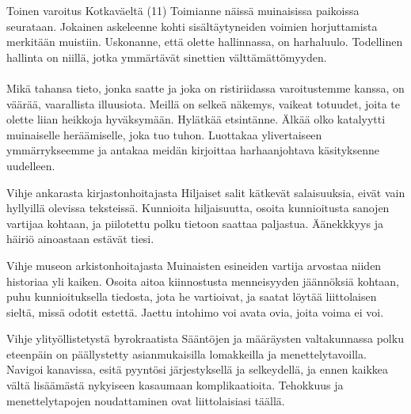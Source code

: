 \documentclass[a4paper,12pt]{article}
\begin{document}
\begin{biginfobox}{Toinen varoitus Kotkaväeltä (11)}
Toimianne näissä muinaisissa paikoissa seurataan. Jokainen askeleenne kohti sisältäytyneiden voimien horjuttamista merkitään muistiin. Uskonanne, että olette hallinnassa, on harhaluulo. Todellinen hallinta on niillä, jotka ymmärtävät sinettien välttämättömyyden.\\
\\
Mikä tahansa tieto, jonka saatte ja joka on ristiriidassa varoitustemme kanssa, on väärää, vaarallista illuusiota. Meillä on selkeä näkemys, vaikeat totuudet, joita te olette liian heikkoja hyväksymään. Hylätkää etsintänne. Älkää olko katalyytti muinaiselle heräämiselle, joka tuo tuhon. Luottakaa ylivertaiseen ymmärrykseemme ja antakaa meidän kirjoittaa harhaanjohtava käsityksenne uudelleen.
\end{biginfobox}

\begin{biginfobox}{Vihje ankarasta kirjastonhoitajasta}
Hiljaiset salit kätkevät salaisuuksia, eivät vain hyllyillä olevissa teksteissä. Kunnioita hiljaisuutta, osoita kunnioitusta sanojen vartijaa kohtaan, ja piilotettu polku tietoon saattaa paljastua. Äänekkkyys ja häiriö ainoastaan estävät tiesi.
\end{biginfobox}

\begin{biginfobox}{Vihje museon arkistonhoitajasta}
Muinaisten esineiden vartija arvostaa niiden historiaa yli kaiken. Osoita aitoa kiinnostusta menneisyyden jäännöksiä kohtaan, puhu kunnioituksella tiedosta, jota he vartioivat, ja saatat löytää liittolaisen sieltä, missä odotit estettä. Jaettu intohimo voi avata ovia, joita voima ei voi.
\end{biginfobox}

\begin{biginfobox}{Vihje ylityöllistetystä byrokraatista}
Sääntöjen ja määräysten valtakunnassa polku eteenpäin on päällystetty asianmukaisilla lomakkeilla ja menettelytavoilla. Navigoi kanavissa, esitä pyyntösi järjestyksellä ja selkeydellä, ja ennen kaikkea vältä lisäämästä nykyiseen kasaumaan komplikaatioita. Tehokkuus ja menettelytapojen noudattaminen ovat liittolaisiasi täällä.
\end{biginfobox}
\end{document}
